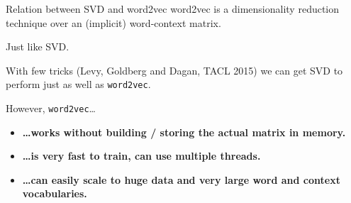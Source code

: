 \documentclass[compress]{beamer}
\begin{document}
\begin{frame}{Relation between SVD and word2vec}
word2vec is a dimensionality reduction technique over an (implicit) word-context
matrix.

\vspace{1em}

Just like SVD.

\vspace{1em}
With few tricks {\footnotesize(Levy, Goldberg and Dagan, TACL 2015)}
we can get SVD to perform just as well as \texttt{word2vec}.

\pause
\vspace{1em}
However, \texttt{word2vec}\ldots

\begin{itemize}
    \item \textbf{\ldots works without building / storing the actual matrix in memory.}
    \item \textbf{\ldots is very fast to train, can use multiple threads.}
    \item \textbf{\ldots can easily scale to huge data and very large word
and context vocabularies.}
\end{itemize}
\end{frame}

\end{document}
